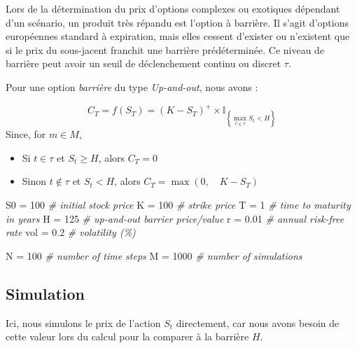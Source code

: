 \documentclass[
]{article}
\newenvironment{Shaded}{\begin{snugshade}}{\end{snugshade}}
\newcommand{\CommentTok}[1]{\textcolor[rgb]{0.56,0.35,0.01}{\textit{#1}}}
\newcommand{\DecValTok}[1]{\textcolor[rgb]{0.00,0.00,0.81}{#1}}
\newcommand{\FloatTok}[1]{\textcolor[rgb]{0.00,0.00,0.81}{#1}}
\newcommand{\NormalTok}[1]{#1}
\newcommand{\OtherTok}[1]{\textcolor[rgb]{0.56,0.35,0.01}{#1}}
\providecommand{\tightlist}{%
  \setlength{\itemsep}{0pt}\setlength{\parskip}{0pt}}
\begin{document}
Lors de la détermination du prix d'options complexes ou exotiques
dépendant d'un scénario, un produit très répandu est l'option à
barrière. Il s'agit d'options européennes standard à expiration, mais
elles cessent d'exister ou n'existent que si le prix du sous-jacent
franchit une barrière prédéterminée. Ce niveau de barrière peut avoir un
seuil de déclenchement continu ou discret \(\tau\).

Pour une option \emph{barrière} du type \emph{Up-and-out}, nous avons :

\[
C_{T}=f(S_{T})=(K-S_{T})^{+}\times\mathbb{I}_{\left\{ \max\limits _{t\in\tau}S_{t}<H\right\} }
\] Since, for \(m\in M\),

\begin{itemize}
\tightlist
\item
  Si \(t\in\tau\) et \(S_t\geq H\), alors \(C_T = 0\)
\item
  Sinon \(t\notin\tau\) et \(S_t < H\), alors
  \(C_T = \max (0,\quad K-S_T)\)
\end{itemize}

\begin{Shaded}
\begin{Highlighting}[]
\NormalTok{S0 }\OtherTok{=} \DecValTok{100}      \CommentTok{\# initial stock price}
\NormalTok{K }\OtherTok{=} \DecValTok{100}       \CommentTok{\# strike price}
\NormalTok{T }\OtherTok{=} \DecValTok{1}         \CommentTok{\# time to maturity in years}
\NormalTok{H }\OtherTok{=} \DecValTok{125}       \CommentTok{\# up{-}and{-}out barrier price/value}
\NormalTok{r }\OtherTok{=} \FloatTok{0.01}      \CommentTok{\# annual risk{-}free rate}
\NormalTok{vol }\OtherTok{=} \FloatTok{0.2}     \CommentTok{\# volatility (\%)}

\NormalTok{N }\OtherTok{=} \DecValTok{100}       \CommentTok{\# number of time steps}
\NormalTok{M }\OtherTok{=} \DecValTok{1000}      \CommentTok{\# number of simulations}
\end{Highlighting}
\end{Shaded}

\hypertarget{simulation}{%
\subsection{Simulation}\label{simulation}}

Ici, nous simulons le prix de l'action \(S_t\) directement, car nous
avons besoin de cette valeur lors du calcul pour la comparer à la
barrière \(H\).
\end{document}
